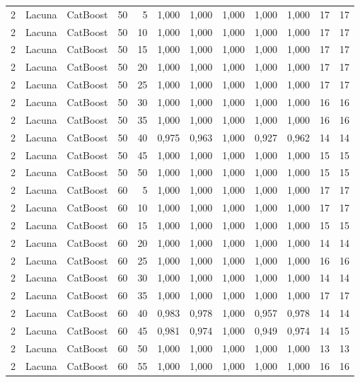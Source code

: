 \begin{longtable}{@{}rllrrrrrrrrr@{}}
2 & Lacuna & CatBoost & 50 & 5 & 1,000 & 1,000 & 1,000 & 1,000 & 1,000 & 17 & 17 \\
2 & Lacuna & CatBoost & 50 & 10 & 1,000 & 1,000 & 1,000 & 1,000 & 1,000 & 17 & 17 \\
2 & Lacuna & CatBoost & 50 & 15 & 1,000 & 1,000 & 1,000 & 1,000 & 1,000 & 17 & 17 \\
2 & Lacuna & CatBoost & 50 & 20 & 1,000 & 1,000 & 1,000 & 1,000 & 1,000 & 17 & 17 \\
2 & Lacuna & CatBoost & 50 & 25 & 1,000 & 1,000 & 1,000 & 1,000 & 1,000 & 17 & 17 \\
2 & Lacuna & CatBoost & 50 & 30 & 1,000 & 1,000 & 1,000 & 1,000 & 1,000 & 16 & 16 \\
2 & Lacuna & CatBoost & 50 & 35 & 1,000 & 1,000 & 1,000 & 1,000 & 1,000 & 16 & 16 \\
2 & Lacuna & CatBoost & 50 & 40 & 0,975 & 0,963 & 1,000 & 0,927 & 0,962 & 14 & 14 \\
2 & Lacuna & CatBoost & 50 & 45 & 1,000 & 1,000 & 1,000 & 1,000 & 1,000 & 15 & 15 \\
2 & Lacuna & CatBoost & 50 & 50 & 1,000 & 1,000 & 1,000 & 1,000 & 1,000 & 15 & 15 \\
2 & Lacuna & CatBoost & 60 & 5 & 1,000 & 1,000 & 1,000 & 1,000 & 1,000 & 17 & 17 \\
2 & Lacuna & CatBoost & 60 & 10 & 1,000 & 1,000 & 1,000 & 1,000 & 1,000 & 17 & 17 \\
2 & Lacuna & CatBoost & 60 & 15 & 1,000 & 1,000 & 1,000 & 1,000 & 1,000 & 15 & 15 \\
2 & Lacuna & CatBoost & 60 & 20 & 1,000 & 1,000 & 1,000 & 1,000 & 1,000 & 14 & 14 \\
2 & Lacuna & CatBoost & 60 & 25 & 1,000 & 1,000 & 1,000 & 1,000 & 1,000 & 16 & 16 \\
2 & Lacuna & CatBoost & 60 & 30 & 1,000 & 1,000 & 1,000 & 1,000 & 1,000 & 14 & 14 \\
2 & Lacuna & CatBoost & 60 & 35 & 1,000 & 1,000 & 1,000 & 1,000 & 1,000 & 17 & 17 \\
2 & Lacuna & CatBoost & 60 & 40 & 0,983 & 0,978 & 1,000 & 0,957 & 0,978 & 14 & 14 \\
2 & Lacuna & CatBoost & 60 & 45 & 0,981 & 0,974 & 1,000 & 0,949 & 0,974 & 14 & 15 \\
2 & Lacuna & CatBoost & 60 & 50 & 1,000 & 1,000 & 1,000 & 1,000 & 1,000 & 13 & 13 \\
2 & Lacuna & CatBoost & 60 & 55 & 1,000 & 1,000 & 1,000 & 1,000 & 1,000 & 16 & 16 \\

\end{longtable}
